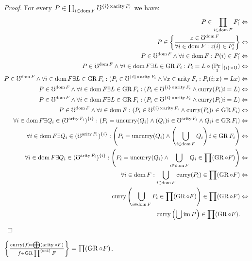 \begin{proof}
For every $P\in\coprod_{i\in\operatorname{dom} F}\mho^{\{i\}\times\operatorname{arity} F_{i}}$
we have:
\begin{align*}
P\in\prod_{i\in\operatorname{dom} F}F'_{i} & \Leftrightarrow\\
P\in\left\{ \frac{z\in\mho^{\operatorname{dom} F}}{\forall i\in\operatorname{dom} F:z(i)\in F'_{i}}\right\} & \Leftrightarrow\\
P\in\mho^{\operatorname{dom} F}\land\forall i\in\operatorname{dom} F:P(i)\in F'_{i} & \Leftrightarrow\\
P\in\mho^{\operatorname{dom} F}\land\forall i\in\operatorname{dom} F\exists L\in\operatorname{GR} F_{i}:P_{i}=L\circ(\Pr_{1}|_{\{i\}\times\mho}) & \Leftrightarrow\\
P\in\mho^{\operatorname{dom} F}\land\forall i\in\operatorname{dom} F\exists L\in\operatorname{GR} F_{i}:(P_{i}\in\mho^{\{i\}\times\operatorname{arity} F_{i}}\land\forall x\in\operatorname{arity} F_{i}:P_{i}(i;x)=Lx) & \Leftrightarrow\\
P\in\mho^{\operatorname{dom} F}\land\forall i\in\operatorname{dom} F\exists L\in\operatorname{GR} F_{i}:(P_{i}\in\mho^{\{i\}\times\operatorname{arity} F_{i}}\land\operatorname{curry}(P_{i})i=L) & \Leftrightarrow\\
P\in\mho^{\operatorname{dom} F}\land\forall i\in\operatorname{dom} F\exists L\in\operatorname{GR} F_{i}:(P_{i}\in\mho^{\{i\}\times\operatorname{arity} F_{i}}\land\operatorname{curry}(P_{i})i=L) & \Leftrightarrow\\
P\in\mho^{\operatorname{dom} F}\land\forall i\in\operatorname{dom} F:(P_{i}\in\mho^{\{i\}\times\operatorname{arity} F_{i}}\land\operatorname{curry}(P_{i})i\in\operatorname{GR} F_{i}) & \Leftrightarrow\\
\forall i\in\operatorname{dom} F\exists Q_{i}\in(\mho^{\operatorname{arity} F_{i}})^{\{i\}}:(P_{i}=\operatorname{uncurry}(Q_{i})\land(Q_{i})i\in\mho^{\operatorname{arity} F_{i}}\land Q_{i}i\in\operatorname{GR} F_{i}) & \Leftrightarrow\\
\forall i\in\operatorname{dom} F\exists Q_{i}\in(\mho^{\operatorname{arity} F_{i}})^{\{i\}}:\left(P_{i}=\operatorname{uncurry}(Q_{i})\land\left(\bigcup_{i\in\operatorname{dom} F}Q_{i}\right)i\in\operatorname{GR} F_{i}\right) & \Leftrightarrow\\
\forall i\in\operatorname{dom} F\exists Q_{i}\in(\mho^{\operatorname{arity} F_{i}})^{\{i\}}:\left(P_{i}=\operatorname{uncurry}(Q_{i})\land\bigcup_{i\in\operatorname{dom} F}Q_{i}\in\prod(\operatorname{GR}\circ F)\right) & \Leftrightarrow\\
\forall i\in\operatorname{dom} F:\bigcup_{i\in\operatorname{dom} F}\operatorname{curry}(P_{i})\in\prod(\operatorname{GR}\circ F) & \Leftrightarrow\\
\operatorname{curry}\left(\bigcup_{i\in\operatorname{dom} F}P_{i}\in\prod(\operatorname{GR}\circ F)\right)\in\prod(\operatorname{GR}\circ F) & \Leftrightarrow\\
\operatorname{curry}\left(\bigcup\operatorname{im} P\right)\in\prod(\operatorname{GR}\circ F).
\end{align*}
\end{proof}
\begin{lem}
$\left\{ \frac{\operatorname{curry}(f)\circ\bigoplus(\operatorname{arity}\circ F)}{f\in\operatorname{GR}\prod^{\mathrm{(ord)}}F}\right\}=\prod(\operatorname{GR}\circ F)$.\end{lem}
